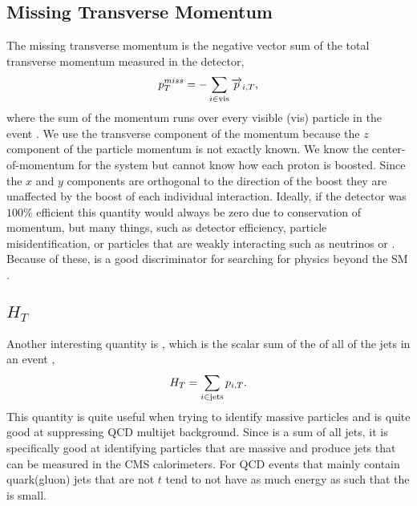 \subsection{Missing Transverse Momentum}\label{MET}
The missing transverse momentum \cite{lester_measuring_1999, barr_variable_2003} is the negative vector sum of the total transverse momentum measured in the detector,
\begin{equation}
p_{T}^{miss}=-\sum_{i\in\text{vis}}\overrightarrow{p}_{i, T},
\end{equation}
where the sum of the momentum runs over every visible (vis) particle in the event \cite{collaboration_missing_2011,penning_pursuit_2018}. We use the transverse component of the momentum because the $z$ component of the particle momentum is not exactly known. We know the center-of-momentum for the system but cannot know how each proton is boosted. Since the $x$ and $y$ components are orthogonal to the direction of the boost they are unaffected by the boost of each individual interaction. Ideally, if the detector was $100\%$ efficient this quantity would always be zero due to conservation of momentum, but many things, such as detector efficiency, particle misidentification, or particles that are weakly interacting such as neutrinos or \neutralino. Because of these, \met{} is a good discriminator for searching for physics beyond the SM \cite{noauthor_https://twiki.cern.ch/twiki/bin/view/cms/missingetrun2corrections_nodate}. 


\subsection{$H_T$}\label{HT}
Another interesting quantity is \Ht, which is the scalar sum of the \pt{} of all of the jets in an event \cite{cms_collaboration_search_2011},
\begin{equation}
H_{T}=\sum_{i\in\text{jets}}p_{i,T}.
\end{equation}
This quantity is quite useful when trying to identify massive particles and is quite good at suppressing QCD multijet background. Since \Ht{} is a sum of all jets, it is specifically good at identifying particles that are massive and produce jets that can be measured in the CMS calorimeters. For QCD events that mainly contain quark(gluon) jets that are not $t$ tend to not have as much energy as such that the \Ht{} is small. 

